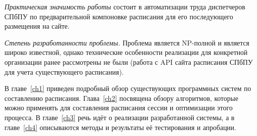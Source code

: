 
\textit{Практическая значимость работы} состоит в автоматизации труда диспетчеров СПбПУ по предварительной компоновке расписания для его последующего размещения на сайте.


\textit{Степень разработанности проблемы.} Проблема является NP-полной и является широко известной, однако технические особенности реализации для конкретной организации ранее рассмотрены не были (работа с API сайта расписания СПбПУ для учета существующего расписания).


В главе~\ref{ch1} приведен подробный обзор существующих программных систем по составлению расписания. Глава~\ref{ch2} посвящена обзору алгоритмов, которые можно применять для составления расписания сессии и оптимизации этого процесса. В главе~\ref{ch3} речь идёт о реализации разработанной системы, а в главе~\ref{ch4} описываются методы и результаты её тестирования и апробации.
